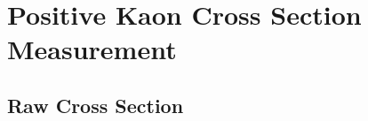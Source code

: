 \chapter{Positive Kaon Cross Section Measurement}\label{ch:KaonXS}
\section{Raw Cross Section}\label{ch:KaonXSRaw}
